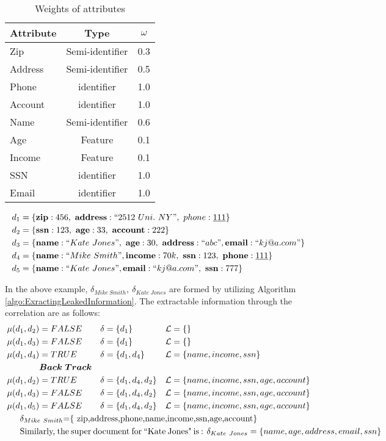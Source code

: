 \begin{table*}[htp]
\caption{Weights of attributes}
\label{tab:weightTable}
\centering
\begin{tabular}{lcc}
\toprule
\textbf{Attribute} & \textbf{Type} & \textbf{$\omega$}\\
\midrule
Zip      & Semi-identifier  & 0.3 \\ 
Address  & Semi-identifier  & 0.5 \\
Phone    & identifier       & 1.0 \\
Account  & identifier       & 1.0 \\
Name     & Semi-identifier  & 0.6 \\
Age      & Feature          & 0.1 \\
Income   & Feature          & 0.1 \\
SSN      & identifier       & 1.0 \\
Email    & identifier       & 1.0 \\
\bottomrule
\end{tabular}
\end{table*}

\begin{align*}
d_1&=\{ {\bf zip} : 456 ,~{\bf address}:``2512~ Uni.~NY",~ phone:\underline{111}\}\\
d_2&=\{ {\bf ssn} : 123,~ {\bf age} : 33,~ {\bf account}: 222 \}\\
d_3&=\{ {\bf name} : ``Kate~Jones",~ {\bf age} : 30,~ {\bf address}: ``abc",{\bf email}:``kj@a.com" \}\\
d_4&=\{ {\bf name} : ``Mike~Smith", {\bf income} :70k,~ {\bf ssn}:123, ~ {\bf phone}:\underline{111}\}\\
d_5&=\{ {\bf name} : ``Kate~Jones",{\bf email}:``kj@a.com",~ {\bf ssn} : 777\}
\end{align*}


\noindent In the above example, $\delta_{Mike~Smith},~\delta_{Kate~Jones}$ are formed by utilizing Algorithm \ref{algo:ExractingLeakedInformation}. The extractable information through the correlation are as follows:
\begin{align*}
\mu(d_1,d_2)&=FALSE & \delta&=\{d_1\}& \mathcal{L}&=\{\}\\
\mu(d_1,d_3)&=FALSE & \delta&=\{d_1\}& \mathcal{L}&=\{\}\\
\mu(d_1,d_4)&=TRUE  & \delta&=\{d_1, d_4\}& \mathcal{L}&=\{name,income,ssn\}\\
&\bm{Back~Track} &&&&\\
\mu(d_1,d_2)&=TRUE  & \delta&=\{d_1, d_4, d_2\}& \mathcal{L}&=\{name,income,ssn, age, account\}\\
\mu(d_1,d_3)&=FALSE  &\delta&=\{d_1, d_4, d_2\}& \mathcal{L}&=\{name,income,ssn, age, account\}\\
\mu(d_1,d_5)&=FALSE  &\delta&=\{d_1, d_4, d_2\}& \mathcal{L}&=\{name,income,ssn, age, account\}\\
\noalign{$\delta_{Mike~Smith}$=\{ zip,address,phone,name,income,ssn,age,account\}}
\noalign{Similarly, the super document for ``Kate Jones" is : $\delta_{Kate~Jones}=\{ name, age, address, email, ssn\}$}
\end{align*}


